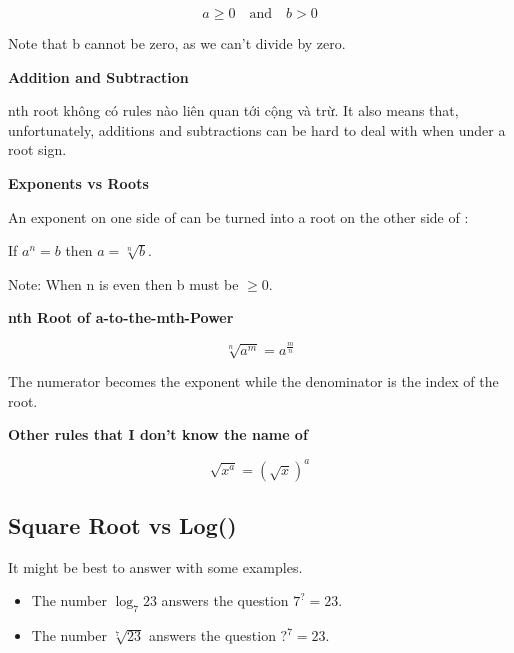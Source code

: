 \[a \geq 0 \quad \text{and} \quad b > 0\]

Note that b cannot be zero, as we can't divide by zero.

\textbf{Addition and Subtraction}

nth root không có rules nào liên quan tới cộng và trừ. It also means that, unfortunately, additions and subtractions can be hard to deal with when under a root sign.

\textbf{Exponents vs Roots}

An exponent on one side of \q{=} can be turned into a root on the other side of \q{=}:

If \(a^{n}=b\) then \(a=\sqrt[n]{b}\).

Note: When n is even then b must be \(\geq 0\).



\vspace{5 mm}

\textbf{nth Root of a-to-the-mth-Power}

\[\sqrt[n]{a^{m}}=a^{\frac{m}{n}}\]

The numerator becomes the exponent while the denominator is the index of the root.

\vspace{5 mm}

\textbf{Other rules that I don't know the name of}

\[\sqrt{x^{a}}= \left( \sqrt{x} \right)^{a}\]

\subsection{Square Root vs Log()}

It might be best to answer with some examples.

\begin{itemize}
  \item The number $\log_7 23$ answers the question $7^{?} = 23$.
  \item The number $\sqrt[7]{23}$ answers the question $?^7 = 23$.
\end{itemize}

